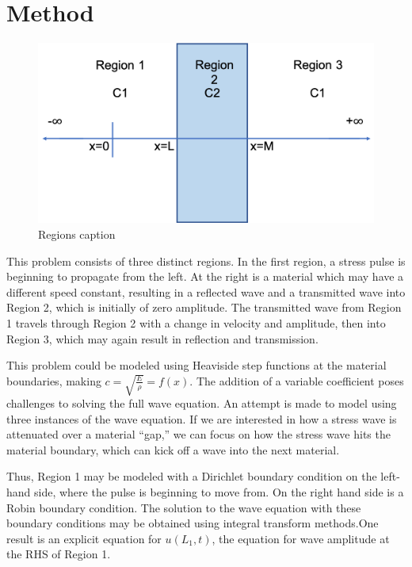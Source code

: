 \documentclass[twocolumn, letterpaper]{article}
\begin{document}
\section*{Method}
\begin{figure}
\includegraphics[width=\columnwidth]{regions}
\caption{Regions caption}
\label{fig:regions}
\end{figure}

This problem consists of three distinct regions. In the first region, a stress pulse is beginning to propagate from the left. At the right is a material which may have a different speed constant, resulting in a reflected wave and a transmitted wave into Region 2, which is initially of zero amplitude. The transmitted wave from Region 1 travels through Region 2 with a change in velocity and amplitude, then into Region 3, which may again result in reflection and transmission.

This problem could be modeled using Heaviside step functions at the material boundaries, making $c = \sqrt{\frac{E}{\rho}} = f(x)$. The addition of a variable coefficient poses challenges to solving the full wave equation. An attempt is made to model using three instances of the wave equation. If we are interested in how a stress wave is attenuated over a material ``gap,'' we can focus on how the stress wave hits the material boundary, which can kick off a wave into the next material. 

Thus, Region 1 may be modeled with a Dirichlet boundary condition on the left-hand side, where the pulse is beginning to move from. On the right hand side is a Robin boundary condition. The solution to the wave equation with these boundary conditions may be obtained using integral transform methods.One result is an explicit equation for $u(L_1,t)$, the equation for wave amplitude at the RHS of Region 1.
\end{document}
